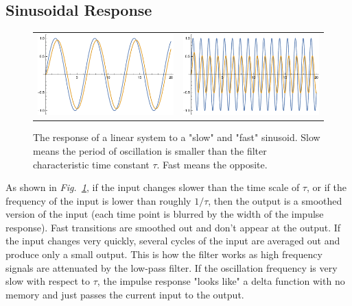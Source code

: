 \subsection{Sinusoidal Response}
\begin{figure}[tb]
\centering
\begin{tabular}{cc}
\includegraphics[width=.45\columnwidth]{slow_sine.pdf} &
\includegraphics[width=.45\columnwidth]{fast_sine.pdf} \\
\end{tabular}
\caption{The response of a linear system to a "slow" and "fast" sinusoid.  Slow means the period of oscillation is smaller than the filter characteristic time constant $\tau$.  Fast means the opposite.}
\label{fig:fast_slow_resp}
\end{figure}
As shown in \emph{Fig.~\ref{fig:fast_slow_resp}}, if the input changes slower than the time scale of $\tau$, or if the frequency of the input is lower than roughly $1/\tau$, then the output is a smoothed version of the input (each time point is blurred by the width of the impulse response).  Fast transitions are smoothed out and don't appear at the output.   If the input changes very quickly, several cycles of the input are averaged out and produce only a small output.  This is how the filter works as high frequency signals are attenuated by the low-pass filter.  If the oscillation frequency is very slow with respect to $\tau$, the impulse response "looks like" a delta function with no memory and just passes the current input to the output.

